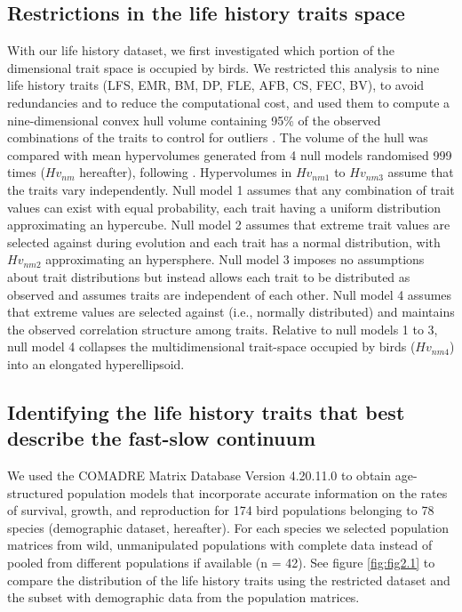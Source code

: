 \subsection*{Restrictions in the life history traits space}

With our life history dataset, we first investigated which portion of the 
dimensional trait space is occupied by birds. We restricted this analysis to
nine life history traits (LFS, EMR, BM, DP, FLE, AFB, CS, FEC, BV), to avoid
redundancies and to reduce the computational cost, and used them to compute a
nine-dimensional convex hull volume containing 95\% of the observed combinations
of the traits  to control for outliers \citep{Diaz2016}. The volume of the hull
was compared with mean hypervolumes generated from 4 null models randomised 999
times ($Hv_{nm}$ hereafter), following \citet{Diaz2016}⁠.
Hypervolumes in $Hv_{nm1}$ to $Hv_{nm3}$ assume that the traits vary
independently. Null model 1 assumes that any combination of trait values can 
exist with equal probability, each trait having a uniform distribution 
approximating an hypercube. Null model 2 assumes that extreme trait values are 
selected against during evolution and each trait has a normal distribution, 
with $Hv_{nm2}$ approximating an hypersphere. Null model 3 imposes no
assumptions about trait distributions but instead allows each trait to be
distributed as observed and assumes traits are independent of each other. Null
model 4 assumes that extreme values are selected against (i.e., normally
distributed) and maintains the observed correlation structure among traits.
Relative to null models 1 to 3, null model 4 collapses the multidimensional
trait-space occupied by birds ($Hv_{nm4}$) into an elongated hyperellipsoid.


\subsection*{Identifying the life history traits that best describe the 
fast-slow continuum}

We used the COMADRE Matrix Database Version 4.20.11.0 
\citep{Salguero-Gomez2016} to obtain age-structured population models that 
incorporate accurate information on the rates of survival, growth, and 
reproduction for 174 bird populations belonging to 78 species (demographic 
dataset, hereafter). For each species we selected population matrices from 
wild, unmanipulated populations with complete data instead of pooled from 
different populations if available (n = 42). See figure \ref{fig:fig2.1} to 
compare the distribution of the life history traits using the restricted 
dataset and the subset with demographic data from the population matrices.



